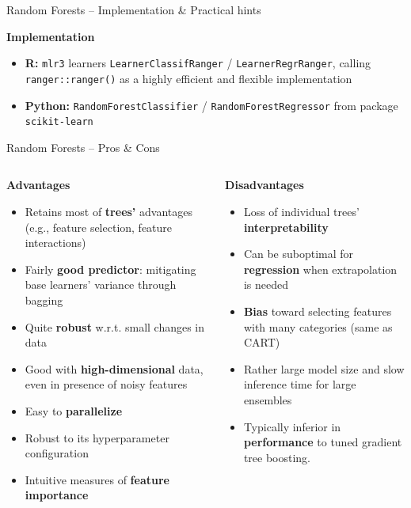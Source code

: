 \documentclass[11pt,compress,t,notes=noshow, xcolor=table]{beamer}
\newcommand{\highlight}[1]{\textcolor{hlcol}{\textbf{#1}}}
\newcommand{\positem}{\item[\textcolor{hlcol}{$\bm{+}$}]}
\newcommand{\negitem}{\item[\textcolor{hlcol}{$\bm{-}$}]}
\begin{document}
\begin{frame2}{Random Forests -- Implementation \& Practical hints}

\highlight{Implementation}

\begin{itemize}
  \item \textbf{R:} \texttt{mlr3} learners \texttt{LearnerClassifRanger} / 
    \texttt{LearnerRegrRanger}, calling \texttt{ranger::ranger()} as a highly efficient and flexible implementation
  \item \textbf{Python:} \texttt{RandomForestClassifier} / 
  \texttt{RandomForestRegressor} from package \texttt{scikit-learn}
\end{itemize}
\end{frame2}

\begin{frame2}{Random Forests -- Pros \& Cons}

  \begin{columns}[onlytextwidth]
    \begin{column}{0.5\textwidth}
      \highlight{Advantages}
      \footnotesize
      \begin{itemize}
        \positem Retains most of \textbf{trees'} advantages (e.g., feature selection, feature interactions)
        \positem Fairly \textbf{good predictor}: mitigating base learners' variance through bagging
        \positem Quite \textbf{robust} w.r.t. small changes in data
        \positem Good with \textbf{high-dimensional} data, even in presence of noisy features
        \positem Easy to \textbf{parallelize}
        \positem Robust to its hyperparameter configuration
        \positem Intuitive measures of \textbf{feature importance}
      \end{itemize}
    \end{column}
    \begin{column}{0.5\textwidth}
      \highlight{Disadvantages}
      \footnotesize
      \begin{itemize}
        \negitem Loss of individual trees' \textbf{interpretability}
        \negitem Can be suboptimal for \textbf{regression} when extrapolation is needed
        \negitem \textbf{Bias} toward selecting features with many categories (same as CART)
        \negitem Rather large model size and slow inference time for large ensembles
        \negitem Typically inferior in \textbf{performance} to tuned gradient tree boosting.
      \end{itemize}
    \end{column}
  \end{columns}
  
\end{frame2}
\end{document}
